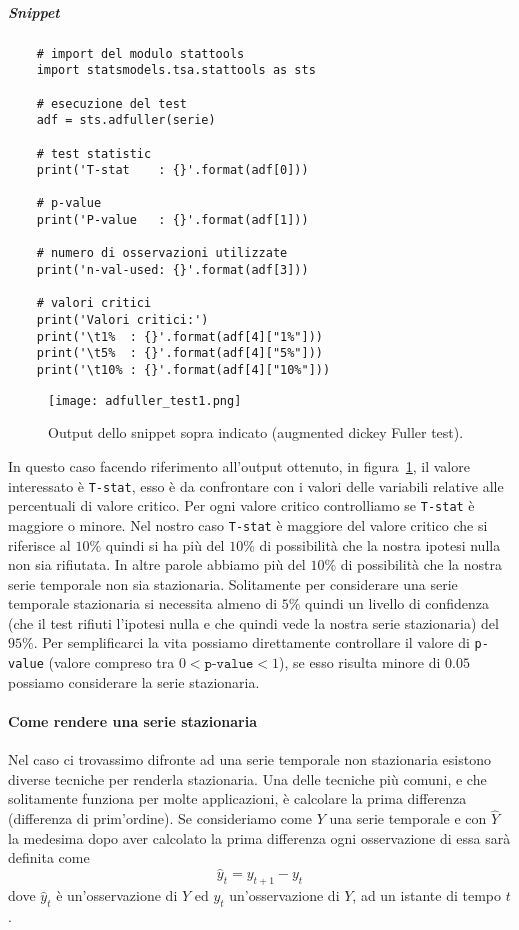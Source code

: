 \subparagraph*{Snippet}
\begin{verbatim}
    # import del modulo stattools
    import statsmodels.tsa.stattools as sts

    # esecuzione del test
    adf = sts.adfuller(serie)

    # test statistic
    print('T-stat    : {}'.format(adf[0]))

    # p-value
    print('P-value   : {}'.format(adf[1]))

    # numero di osservazioni utilizzate
    print('n-val-used: {}'.format(adf[3]))

    # valori critici
    print('Valori critici:')
    print('\t1%  : {}'.format(adf[4]["1%"]))
    print('\t5%  : {}'.format(adf[4]["5%"]))
    print('\t10% : {}'.format(adf[4]["10%"]))
\end{verbatim}


\begin{figure}[H]
    \centering
    \texttt{[image: adfuller\_test1.png]}
    \caption{Output dello snippet sopra indicato (augmented dickey Fuller test).}
    \label{fig:adft_out_ns}
\end{figure}

In questo caso facendo riferimento all'output ottenuto, in figura~\ref{fig:adft_out_ns},
il valore interessato è \texttt{T-stat}, esso è da confrontare con i valori delle variabili
relative alle percentuali di valore critico. Per ogni valore critico controlliamo se
\texttt{T-stat} è maggiore o minore. Nel nostro caso \texttt{T-stat} è maggiore del valore critico
che si riferisce al $10\%$ quindi si ha più del $10\%$ di possibilità che la nostra ipotesi nulla
non sia rifiutata. In altre parole abbiamo più del $10\%$ di possibilità che la nostra
serie temporale non sia stazionaria. Solitamente per considerare una serie temporale 
stazionaria si necessita almeno di $5\%$ quindi un livello di confidenza (che il test rifiuti
l'ipotesi nulla e che quindi vede la nostra serie stazionaria) del $95\%$.
Per semplificarci la vita possiamo direttamente controllare il valore di \texttt{p-value}
(valore compreso tra $0 < \texttt{p-value} < 1$), se esso risulta minore di $0.05$ possiamo considerare
la serie stazionaria.

\paragraph{Come rendere una serie stazionaria}
Nel caso ci trovassimo difronte ad una serie temporale non stazionaria esistono diverse
tecniche per renderla stazionaria. Una delle tecniche più comuni, e che solitamente funziona per molte
applicazioni, è calcolare la prima differenza (differenza di prim'ordine). Se consideriamo
come $Y$ una serie temporale e con $\hat{Y}$ la medesima dopo aver calcolato la prima 
differenza ogni osservazione di essa sarà definita come
\[ \hat{y}_t = y_{t+1} - y_t \]
dove $\hat{y}_t$ è un'osservazione di $\hat{Y}$ ed $y_{t}$ un'osservazione di $Y$, ad un istante
di tempo $t$.
